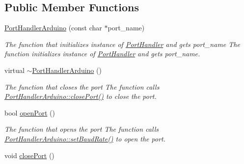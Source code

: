 \subsection*{Public Member Functions}
\begin{DoxyCompactItemize}
\item 
\hyperlink{classmercury_1_1_port_handler_arduino_a54481f6e17666c6e04f721149f8e70f8}{Port\+Handler\+Arduino} (const char $\ast$port\+\_\+name)\hypertarget{classmercury_1_1_port_handler_arduino_a54481f6e17666c6e04f721149f8e70f8}{}\label{classmercury_1_1_port_handler_arduino_a54481f6e17666c6e04f721149f8e70f8}

\begin{DoxyCompactList}\small\item\em The function that initializes instance of \hyperlink{classmercury_1_1_port_handler}{Port\+Handler} and gets port\+\_\+name  The function initializes instance of \hyperlink{classmercury_1_1_port_handler}{Port\+Handler} and gets port\+\_\+name. \end{DoxyCompactList}\item 
virtual \hyperlink{classmercury_1_1_port_handler_arduino_a09890b269b6a041ef96289fbf7f0e9fd}{$\sim$\+Port\+Handler\+Arduino} ()\hypertarget{classmercury_1_1_port_handler_arduino_a09890b269b6a041ef96289fbf7f0e9fd}{}\label{classmercury_1_1_port_handler_arduino_a09890b269b6a041ef96289fbf7f0e9fd}

\begin{DoxyCompactList}\small\item\em The function that closes the port  The function calls \hyperlink{classmercury_1_1_port_handler_arduino_a56c560c6ea70258f04ecf1c529b06e70}{Port\+Handler\+Arduino\+::close\+Port()} to close the port. \end{DoxyCompactList}\item 
bool \hyperlink{classmercury_1_1_port_handler_arduino_a998afa0864dda7b2891238a37ebd06b7}{open\+Port} ()
\begin{DoxyCompactList}\small\item\em The function that opens the port  The function calls \hyperlink{classmercury_1_1_port_handler_arduino_a6cf1955442f7c93cbd83adde3cebc17e}{Port\+Handler\+Arduino\+::set\+Baud\+Rate()} to open the port. \end{DoxyCompactList}\item 
void \hyperlink{classmercury_1_1_port_handler_arduino_a56c560c6ea70258f04ecf1c529b06e70}{close\+Port} ()\hypertarget{classmercury_1_1_port_handler_arduino_a56c560c6ea70258f04ecf1c529b06e70}{}\label{classmercury_1_1_port_handler_arduino_a56c560c6ea70258f04ecf1c529b06e70}


\end{DoxyCompactItemize}

